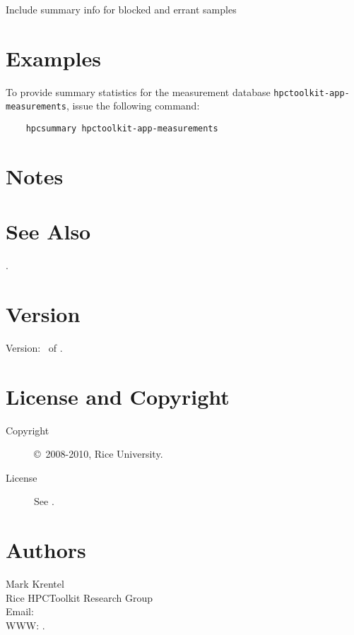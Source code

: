 \documentclass[english]{article}
\begin{document}
\begin{Description}

\item[\Opt{--all}]
Include summary info for blocked and errant samples

\end{Description}


\section{Examples}

To provide summary statistics for the measurement database \texttt{hpctoolkit-app-measurements}, issue the following command:
\begin{verbatim}
    hpcsummary hpctoolkit-app-measurements
\end{verbatim}


\section{Notes}


\section{See Also}

.

\section{Version}

Version: \Version\ of \Date.

\section{License and Copyright}

\begin{description}
\item[Copyright] \copyright\ 2008-2010, Rice University.
\item[License] See .
\end{description}

\section{Authors}

\noindent
Mark Krentel \\
Rice HPCToolkit Research Group \\
Email:  \\
WWW: .

\LatexManEnd
\end{document}
